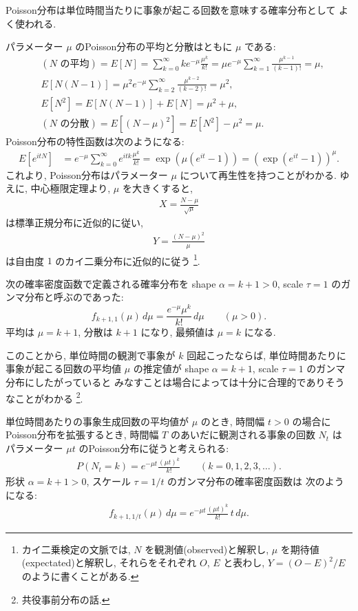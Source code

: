 \documentclass[12pt,twoside]{jarticle}
\theoremstyle{jplain}
\theoremstyle{jplain}
\theoremstyle{jplain}
\numberwithin{theorem}{section}
\numberwithin{equation}{section}
\numberwithin{figure}{section}
\numberwithin{table}{section}
\begin{document}
Poisson分布は単位時間当たりに事象が起こる回数を意味する確率分布として
よく使われる.

パラメーター $\mu$ のPoisson分布の平均と分散はともに $\mu$ である:
\begin{align*}
&
(\text{$N$ の平均})
=E[N]
= \sum_{k=0}^\infty k e^{-\mu}\frac{\mu^k}{k!}
= \mu e^{-\mu} \sum_{k=1}^\infty \frac{\mu^{k-1}}{(k-1)!}
= \mu,
\\ &
E[N(N-1)]
= \mu^2 e^{-\mu} \sum_{k=2}^\infty \frac{\mu^{k-2}}{(k-2)!}
= \mu^2,
\\ &
E[N^2] = E[N(N-1)]+E[N]=\mu^2+\mu,
\\ &
(\text{$N$ の分散})=E[(N-\mu)^2] = E[N^2]-\mu^2 = \mu.
\end{align*}
Poisson分布の特性函数は次のようになる:
\begin{align*}
E[e^{itN}]
&= e^{-\mu} \sum_{k=0}^\infty e^{itk} \frac{\mu^k}{k!}
= \exp(\mu(e^{it}-1))
= \left(\exp(e^{it}-1)\right)^\mu.
\end{align*}
これより, Poisson分布はパラメーター $\mu$ について再生性を持つことがわかる.
ゆえに, 中心極限定理より, $\mu$ を大きくすると,
\begin{align*}
X = \frac{N-\mu}{\sqrt{\mu}}
\end{align*}
は標準正規分布に近似的に従い,
\begin{align*}
Y = \frac{(N-\mu)^2}{\mu}
\end{align*}
は自由度 $1$ のカイ二乗分布に近似的に従う%
\footnote{%
カイ二乗検定の文脈では,
$N$ を観測値(observed)と解釈し,
$\mu$ を期待値(expectated)と解釈し,
それらをそれぞれ $O$, $E$ と表わし, $Y=(O-E)^2/E$
のように書くことがある.}.

次の確率密度函数で定義される確率分布を
shape $\alpha=k+1>0$, scale $\tau=1$ のガンマ分布と呼ぶのであった:
\[
f_{k+1,1}(\mu)\,d\mu
=\frac{e^{-\mu}\mu^k}{k!}\,d\mu
\qquad (\mu>0).
\]
平均は $\mu=k+1$, 分散は $k+1$ になり,
最頻値は $\mu=k$ になる.

このことから, 単位時間の観測で事象が $k$ 回起こったならば,
単位時間あたりに事象が起こる回数の平均値 $\mu$ の推定値が
shape $\alpha=k+1$, scale $\tau=1$ のガンマ分布にしたがっていると
みなすことは場合によっては十分に合理的でありそうなことがわかる%
\footnote{共役事前分布の話.}.

単位時間あたりの事象生成回数の平均値が $\mu$ のとき,
時間幅 $t>0$ の場合にPoisson分布を拡張するとき,
時間幅 $T$ のあいだに観測される事象の回数 $N_t$ は
パラメーター $\mu t$ のPoisson分布に従うと考えられる:
\begin{align*}
P(N_t=k) = e^{-\mu t}\frac{(\mu t)^k}{k!}
\qquad (k=0,1,2,3,\ldots).
\end{align*}
形状 $\alpha=k+1>0$, スケール $\tau=1/t$ のガンマ分布の確率密度函数は
次のようになる:
\begin{align*}
f_{k+1,1/t}(\mu)\,d\mu
=e^{-\mu t} \frac{(\mu t)^k}{k!}\,t\,d\mu.
\end{align*}
\end{document}
